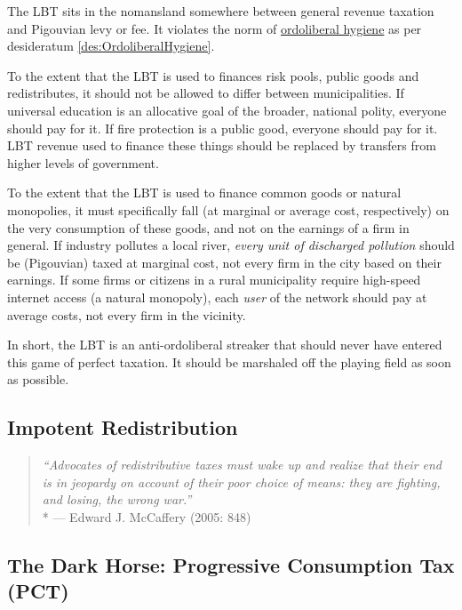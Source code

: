 The LBT sits in the nomansland somewhere between general revenue taxation and Pigouvian levy or fee. It violates the norm of \hyperref[des:OrdoliberalHygiene]{ordoliberal hygiene} as per desideratum \ref{des:OrdoliberalHygiene}.

To the extent that the LBT is used to finances risk pools, public goods and redistributes, it should not be allowed to differ between municipalities. If universal education is an allocative goal of the broader, national polity, everyone should pay for it. If fire protection is a public good, everyone should pay for it. LBT revenue used to finance these things should be replaced by transfers from higher levels of government. %

To the extent that the LBT is used to finance common goods or natural monopolies, it must specifically fall (at marginal or average cost, respectively) on the very consumption of these goods, and not on the earnings of a firm in general. If industry pollutes a local river, \emph{every unit of discharged pollution} should be (Pigouvian) taxed at marginal cost, not every firm in the city based on their earnings. If some firms or citizens in a rural municipality require high-speed internet access (a natural monopoly), each \emph{user} of the network should pay at average costs, not every firm in the vicinity. %

In short, the LBT is an anti-ordoliberal streaker that should never have entered this game of perfect taxation. It should be marshaled off the playing field as soon as possible.

\subsection{Impotent Redistribution}

\begin{quote}
	\emph{``Advocates of redistributive taxes must wake up and realize that their end is in jeopardy on account of their poor choice of means: they are fighting, and losing, the wrong war.''}\\*
	--- Edward J. McCaffery (2005: 848)
\end{quote}


\subsection[Progressive Consumption Tax]{The Dark Horse: Progressive Consumption Tax (PCT)} \label{sec:ScorePCT}

